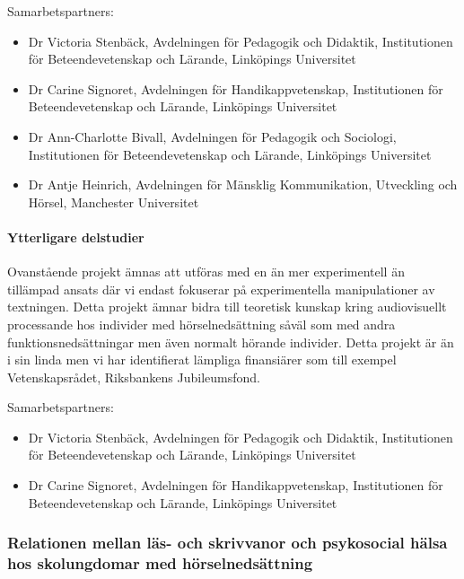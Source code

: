 \documentclass[]{article}
\providecommand{\tightlist}{%
  \setlength{\itemsep}{0pt}\setlength{\parskip}{0pt}}
\begin{document}
Samarbetspartners:

\begin{itemize}
\tightlist
\item
  Dr Victoria Stenbäck, Avdelningen för Pedagogik och Didaktik,
  Institutionen för Beteendevetenskap och Lärande, Linköpings
  Universitet
\item
  Dr Carine Signoret, Avdelningen för Handikappvetenskap, Institutionen
  för Beteendevetenskap och Lärande, Linköpings Universitet
\item
  Dr Ann-Charlotte Bivall, Avdelningen för Pedagogik och Sociologi,
  Institutionen för Beteendevetenskap och Lärande, Linköpings
  Universitet
\item
  Dr Antje Heinrich, Avdelningen för Mänsklig Kommunikation, Utveckling
  och Hörsel, Manchester Universitet
\end{itemize}

\hypertarget{ytterligare-delstudier}{%
\paragraph{Ytterligare delstudier}\label{ytterligare-delstudier}}

Ovanstående projekt ämnas att utföras med en än mer experimentell än
tillämpad ansats där vi endast fokuserar på experimentella
manipulationer av textningen. Detta projekt ämnar bidra till teoretisk
kunskap kring audiovisuellt processande hos individer med
hörselnedsättning såväl som med andra funktionsnedsättningar men även
normalt hörande individer. Detta projekt är än i sin linda men vi har
identifierat lämpliga finansiärer som till exempel Vetenskapsrådet,
Riksbankens Jubileumsfond.

Samarbetspartners:

\begin{itemize}
\tightlist
\item
  Dr Victoria Stenbäck, Avdelningen för Pedagogik och Didaktik,
  Institutionen för Beteendevetenskap och Lärande, Linköpings
  Universitet
\item
  Dr Carine Signoret, Avdelningen för Handikappvetenskap, Institutionen
  för Beteendevetenskap och Lärande, Linköpings Universitet
\end{itemize}

\hypertarget{relationen-mellan-luxe4s--och-skrivvanor-och-psykosocial-huxe4lsa-hos-skolungdomar-med-huxf6rselnedsuxe4ttning}{%
\subsubsection{Relationen mellan läs- och skrivvanor och psykosocial
hälsa hos skolungdomar med
hörselnedsättning}\label{relationen-mellan-luxe4s--och-skrivvanor-och-psykosocial-huxe4lsa-hos-skolungdomar-med-huxf6rselnedsuxe4ttning}}
\end{document}
